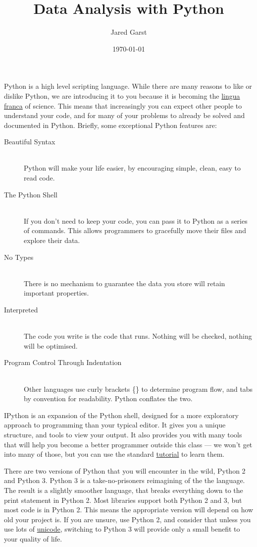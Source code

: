 \documentclass[justified]{tufte-handout}
\title{Data Analysis with Python}
\author{Jared Garst}
\date{\today} %
\newcommand{\aboutUnicodeLink}
  {http://www.joelonsoftware.com/articles/Unicode.html}
\newcommand{\ipythonTutorialLink}
  {http://ipython.org/ipython-doc/stable/interactive/tutorial.html}
\newcommand{\linguaFrancaLink}{http://en.wikipedia.org/wiki/Lingua_franca}
\begin{document}
\maketitle
\bigskip

\noindent
Python is a high level scripting language. While there are many reasons to like
or dislike Python, we are introducing it to you because it is becoming the
\href{\linguaFrancaLink}{lingua franca} of
science. This means that increasingly you can expect other people to understand
your code, and for many of your problems to already be solved and documented in
Python. Briefly, some exceptional Python features are:

\begin{description}
\item[Beautiful Syntax] \hfill \\
  Python will make your life easier, by encouraging simple, clean, easy to read
  code.
\item[The Python Shell] \hfill \\
  If you don't need to keep your code, you can pass it to Python as a series of
  commands. This allows programmers to gracefully move their files and explore
  their data.
\item[No Types] \hfill \\
  There is no mechanism to guarantee the data you store will retain important
  properties.
\item[Interpreted] \hfill \\
  The code you write is the code that runs. Nothing will be checked, nothing
  will be optimised.
\item[Program Control Through Indentation] \hfill \\
  Other languages use curly brackets \{\} to determine program flow, and tabs by
  convention for readability. Python conflates the two.
\end{description}

\noindent
IPython is an expansion of the Python shell, designed for a more exploratory
approach to programming than your typical editor. It gives you a unique
structure, and tools to view your output. It also provides you with many tools
that will help you become a better programmer outside this class --- we won't get
into many of those, but you can use the standard
\href{\ipythonTutorialLink}{tutorial} to learn them.

\smallskip
\noindent
There are two versions of Python that you will encounter in the wild, Python 2
and Python 3. Python 3 is a take-no-prisoners reimagining of the the
language. The result is a slightly smoother language, that breaks everything
down to the print statement in Python 2. Most libraries support both Python 2
and 3, but most code is in Python 2. This means the appropriate version will
depend on how old your project is. If you are unsure, use Python 2, and consider
that unless you use lots of
\href{\aboutUnicodeLink}{unicode}, switching
to Python 3 will provide only a small benefit to your quality of life.
\end{document}
